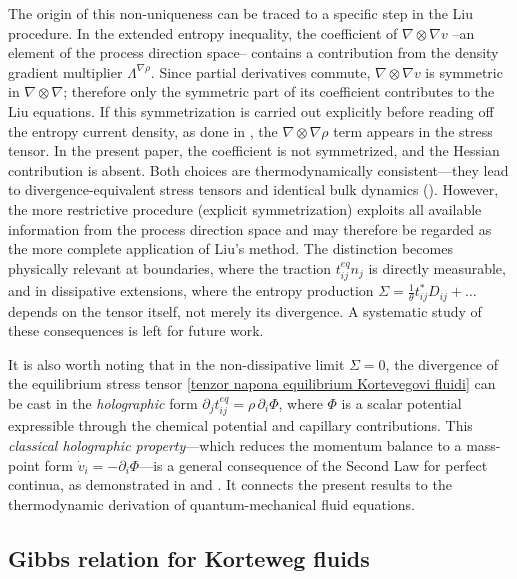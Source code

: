 \documentclass[a4paper,fleqn]{cas-sc}
\theoremstyle{definition}
\begin{document}
The origin of this non-uniqueness can be traced to a specific step in the Liu procedure. In the extended entropy inequality, the coefficient of $\nabla\otimes\nabla v$ --an element of the process direction space-- contains a contribution from the density gradient multiplier $\Lambda^{\nabla\rho}$. Since partial derivatives commute, $\nabla\otimes\nabla v$  is symmetric in $\nabla\otimes\nabla$; therefore only the symmetric part of its coefficient contributes to the Liu equations. If this symmetrization is carried out explicitly before reading off the entropy current density, as done in \cite{szucs2025thermodynamic}, the $\nabla\otimes\nabla\rho$ term appears in the stress tensor. In the present paper, the coefficient is not symmetrized, and the Hessian contribution is absent. Both choices are thermodynamically consistent---they lead to divergence-equivalent stress tensors and identical bulk dynamics (\cite{van2025remarks}). However, the more restrictive procedure (explicit symmetrization) exploits all available information from the process direction space and may therefore be regarded as the more complete application of Liu's method. The distinction becomes physically relevant at boundaries, where the traction $t_{ij}^{eq} n_j$ is directly measurable, and in dissipative extensions, where the entropy production $\Sigma = \frac{1}{\theta} t_{ij}^* D_{ij} + \ldots$ depends on the tensor itself, not merely its divergence. A systematic study of these consequences is left for future work. 

It is also worth noting that in the non-dissipative limit $\Sigma = 0$, the divergence of the equilibrium stress tensor \eqref{tenzor napona equilibrium Kortevegovi fluidi} can be cast in the \emph{holographic} form $\partial_j t_{ij}^{eq} = \rho\,\partial_i\Phi$, where $\Phi$ is a scalar potential expressible through the chemical potential and capillary contributions. This \emph{classical holographic property}---which reduces the momentum balance to a mass-point form $\dot{v}_i = -\partial_i\Phi$---is a general consequence of the Second Law for perfect continua, as demonstrated in \cite{szucs2025thermodynamic} and \cite{van2023holographic}. It connects the present results to the thermodynamic derivation of quantum-mechanical fluid equations.

\subsection{Gibbs relation for Korteweg fluids} \label{Sec:GibbsKorteweg}
\end{document}
